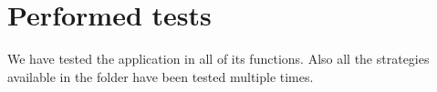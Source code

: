 \chapter{Performed tests}\label{ch:tests}

We have tested the application in all of its functions. Also all the strategies
available in the  folder have been tested multiple times.



